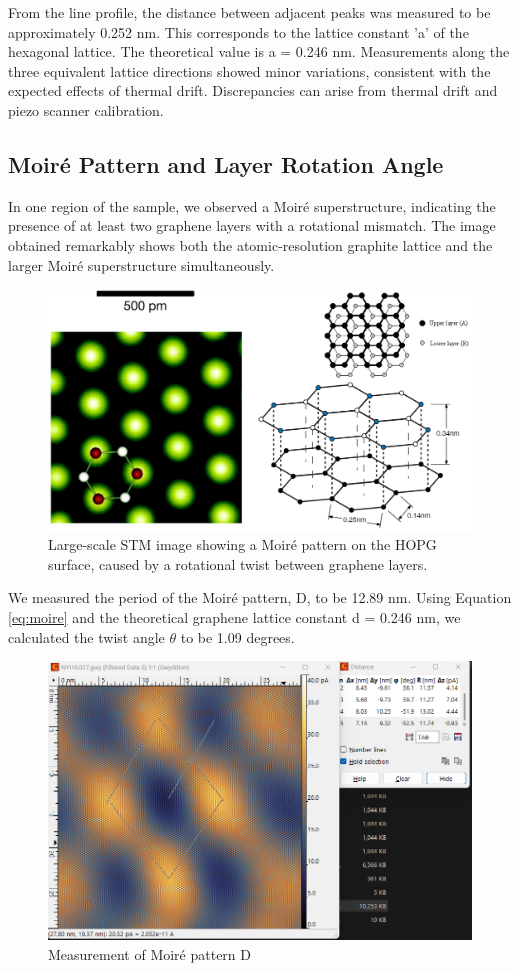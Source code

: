 \documentclass[12pt,a4paper]{article}
\begin{document}
From the line profile, the distance between adjacent peaks was measured to be approximately 0.252 nm. This corresponds to the lattice constant 'a' of the hexagonal lattice. The theoretical value is a = 0.246 nm. Measurements along the three equivalent lattice directions showed minor variations, consistent with the expected effects of thermal drift. Discrepancies can arise from thermal drift and piezo scanner calibration.

\subsection{Moiré Pattern and Layer Rotation Angle}
In one region of the sample, we observed a Moiré superstructure, indicating the presence of at least two graphene layers with a rotational mismatch. The image obtained remarkably shows both the atomic-resolution graphite lattice and the larger Moiré superstructure simultaneously.

\begin{figure}[H]
    \centering
    \includegraphics[width=0.6\linewidth]{../data/gergo_data/hopg.png}
    \caption{Large-scale STM image showing a Moiré pattern on the HOPG surface, caused by a rotational twist between graphene layers.}
    \label{fig:moire}
\end{figure}

We measured the period of the Moiré pattern, D, to be 12.89 nm. Using Equation \ref{eq:moire} and the theoretical graphene lattice constant d = 0.246 nm, we calculated the twist angle $\theta$ to be 1.09 degrees.

\begin{figure}[H]
    \centering
    \includegraphics[width=0.7\linewidth]{../data/tasks/4/moire_with_dist.png}
    \caption{Measurement of Moiré pattern D}
    \label{fig:moire_dist}
\end{figure}
\end{document}
